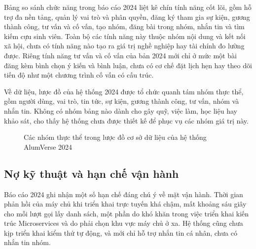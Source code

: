 \documentclass[12pt,a4paper,oneside]{report}
\begin{document}
Bảng so sánh chức năng trong báo cáo 2024 liệt kê chín tính năng cốt lõi, gồm hỗ trợ đa nền tảng, quản lý vai trò và phân quyền, đăng ký tham gia sự kiện, gương thành công, tư vấn và cố vấn, tạo nhóm, đăng bài trong nhóm, nhắn tin và tìm kiếm cựu sinh viên. Toàn bộ các tính năng này thuộc nhóm nội dung và kết nối xã hội, chưa có tính năng nào tạo ra giá trị nghề nghiệp hay tài chính đo lường được. Riêng tính năng tư vấn và cố vấn của bản 2024 mới chỉ ở mức một bài đăng kèm bình chọn ý kiến và bình luận, chưa có cơ chế đặt lịch hẹn hay theo dõi tiến độ như một chương trình cố vấn có cấu trúc.

Về dữ liệu, lược đồ của hệ thống 2024 được tổ chức quanh tám nhóm thực thể, gồm người dùng, vai trò, tin tức, sự kiện, gương thành công, tư vấn, nhóm và nhắn tin. Không có nhóm bảng nào dành cho gây quỹ, việc làm, học liệu hay khảo sát, cho thấy hệ thống chưa được thiết kế để phục vụ các nhóm giá trị này.

\begin{figure}[htbp]\centering
{}
\caption{Các nhóm thực thể trong lược đồ cơ sở dữ liệu của hệ thống AlumVerse 2024}
\label{fig:erd2024}
\end{figure}

\subsection{Nợ kỹ thuật và hạn chế vận hành}

Báo cáo 2024 ghi nhận một số hạn chế đáng chú ý về mặt vận hành. Thời gian phản hồi của máy chủ khi triển khai trực tuyến khá chậm, mất khoảng sáu giây cho mỗi lượt gọi lấy danh sách, một phần do khó khăn trong việc triển khai kiến trúc Microservices và do phải chọn khu vực máy chủ ở xa. Hệ thống cũng chưa kịp triển khai kiểm thử tự động, và mới chỉ hỗ trợ nhắn tin cá nhân, chưa có nhắn tin nhóm.
\end{document}
